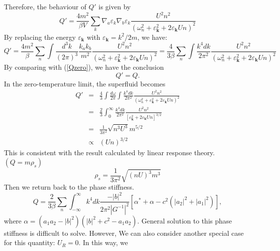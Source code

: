\documentclass{article}
\newcommand{\tmmathbf}[1]{\ensuremath{\boldsymbol{#1}}}
\begin{document}
Therefore, the behaviour of $Q'$ is given by
\begin{equation}
  Q' = \frac{4 m^2}{\beta V} \sum_k \nabla_a \varepsilon_k \nabla_b
  \varepsilon_k \frac{U^2 n^2}{(\omega_n^2 + \varepsilon_{\tmmathbf{k}}^2 + 2
  \varepsilon_{\tmmathbf{k}} U n)^2}
\end{equation}
By replacing the energy $\varepsilon_{\tmmathbf{k}}$ with
$\varepsilon_{\tmmathbf{k}} = k^2 / 2 m$, we have:
\begin{equation}
  Q' = \frac{4 m^2}{\beta} \sum_n \int \frac{d^3 k}{(2 \pi)^3} \frac{k_a
  k_b}{m^2} \frac{U^2 n^2}{(\omega_n^2 + \varepsilon_{\tmmathbf{k}}^2 + 2
  \varepsilon_{\tmmathbf{k}} U n)^2} = \frac{4}{3 \beta} \sum_n \int \frac{k^4
  d k}{2 \pi^2} \frac{U^2 n^2}{(\omega_n^2 + \varepsilon_{\tmmathbf{k}}^2 + 2
  \varepsilon_{\tmmathbf{k}} U n)^2}
\end{equation}
By comparing with (\ref{Qzero}), we have the conclusion
\begin{equation}
  Q' = Q.
\end{equation}
In the zero-temperature limit, the superfluid becomes
\begin{eqnarray}
  Q' & = & \frac{4}{3} \int \frac{d \omega}{2 \pi} \int \frac{k^4 d k}{2
  \pi^2} \frac{U^2 n^2}{(\omega_n^2 + \varepsilon_{\tmmathbf{k}}^2 + 2
  \varepsilon_{\tmmathbf{k}} U n)^2} \nonumber\\
  & = & \frac{2}{3} \int_0^{\infty} \frac{k^4 d k}{2 \pi^2} \frac{U^2
  n^2}{[\varepsilon_{\tmmathbf{k}}^2 + 2 \varepsilon_{\tmmathbf{k}} U n]^{3 /
  2}} \nonumber\\
  & = & \frac{1}{3 \pi^2} \sqrt{n^3 U^3} m^{5 / 2} \nonumber\\
  & \propto & (U n)^{3 / 2} \label{QQ} 
\end{eqnarray}
This is consistent with the result calculated by linear response theory.$(Q =
m \rho_s)$
\begin{equation}
  \rho_s = \frac{1}{3 \pi^2} \sqrt{(n U)^3 m^3}
\end{equation}
Then we return back to the phase stiffness.
\begin{equation}
  Q = \frac{2}{3 \beta} \sum_n \int_{- \infty}^{\infty} k^4 d k \frac{- | b
  |^2}{2 \pi^2 | G^{- 1} |^2} [\alpha^{\ast} + \alpha - c^2 (| a_2 |^2 + | a_1
  |^2)],
\end{equation}
where $\alpha = (a_1 a_2 - | b |^2) (| b |^2 + c^2 - a_1 a_2)$. General
solution to this phase stiffness is difficult to solve. However, We can also
consider another special case for this quantity: $U_R = 0$. In this way, we
\end{document}
